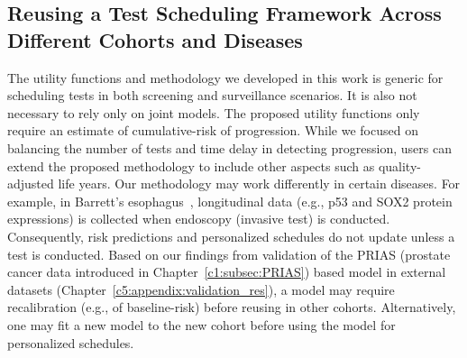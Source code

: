 \subsection{Reusing a Test Scheduling Framework Across Different Cohorts and Diseases}
The utility functions and methodology we developed in this work is generic for scheduling tests in both screening and surveillance scenarios. It is also not necessary to rely only on joint models. The proposed utility functions only require an estimate of cumulative-risk of progression. While we focused on balancing the number of tests and time delay in detecting progression, users can extend the proposed methodology to include other aspects such as quality-adjusted life years. Our methodology may work differently in certain diseases. For example, in Barrett's esophagus~\citep{choi2012screening}, longitudinal data (e.g., p53 and SOX2 protein expressions) is collected when endoscopy (invasive test) is conducted. Consequently, risk predictions and personalized schedules do not update unless a test is conducted. Based on our findings from validation of the PRIAS (prostate cancer data introduced in Chapter~\ref{c1:subsec:PRIAS}) based model in external datasets (Chapter~\ref{c5:appendix:validation_res}), a model may require recalibration (e.g., of baseline-risk) before reusing in other cohorts. Alternatively, one may fit a new model to the new cohort before using the model for personalized schedules.